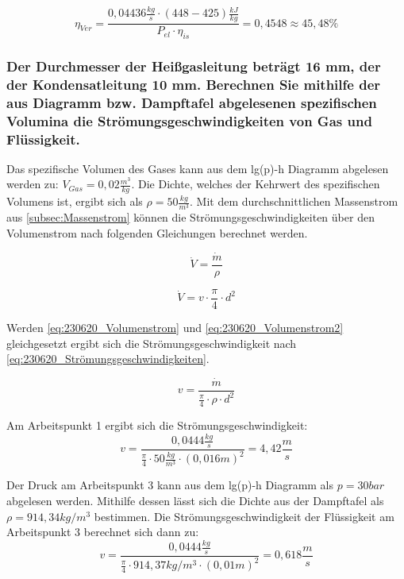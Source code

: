 $$\eta_{Ver} = \frac{0,04436 \frac{kg}{s}\cdot (448-425)\frac{kJ}{kg}}{P_{el}\cdot \eta_{is}}= 0,4548 \approx 45,48 \% $$

\subsubsection{Der Durchmesser der Heißgasleitung beträgt 16 mm, der der Kondensatleitung 10
mm. Berechnen Sie mithilfe der aus Diagramm bzw. Dampftafel abgelesenen spezifischen Volumina die Strömungsgeschwindigkeiten von Gas und Flüssigkeit.}

Das spezifische Volumen des Gases kann aus dem lg(p)-h Diagramm abgelesen werden zu: $V_{Gas}=0,02 \frac{m^3}{kg}$. Die Dichte, welches der Kehrwert des spezifischen Volumens ist, ergibt sich als $\rho=50 \frac{kg}{m^3}$. 
Mit dem durchschnittlichen Massenstrom aus \autoref{subsec:Massenstrom} können die Strömungsgeschwindigkeiten über den Volumenstrom nach folgenden Gleichungen berechnet werden.

\begin{equation}
    \dot{V}= \frac{\dot{m}}{\rho }
    \label{eq:230620_Volumenstrom}
\end{equation}

\begin{equation}
    \dot{V}= v \cdot \frac{\pi}{4} \cdot d^2
    \label{eq:230620_Volumenstrom2}
\end{equation}

Werden \autoref{eq:230620_Volumenstrom} und \autoref{eq:230620_Volumenstrom2} gleichgesetzt ergibt sich die Strömungsgeschwindigkeit nach \autoref{eq:230620_Strömungsgeschwindigkeiten}.

\begin{equation}
    v = \frac{\dot{m}}{\frac{\pi}{4}\cdot \rho \cdot d^2}
    \label{eq:230620_Strömungsgeschwindigkeiten}
\end{equation}

Am Arbeitspunkt 1 ergibt sich die Strömungsgeschwindigkeit:
$$v=\frac{0,0444 \frac{kg}{s}}{\frac{\pi}{4}\cdot 50 \frac{kg}{m^3} \cdot (0,016 m)^2}=4,42 \frac{m}{s} $$

Der Druck am Arbeitspunkt 3 kann aus dem lg(p)-h Diagramm als $p=30 bar$ abgelesen werden. Mithilfe dessen lässt sich die Dichte aus der Dampftafel als $\rho=914,34 kg/m^3$ bestimmen.
Die Strömungsgeschwindigkeit der Flüssigkeit am Arbeitspunkt 3 berechnet sich dann zu:
$$v=\frac{0,0444 \frac{kg}{s}}{\frac{\pi}{4}\cdot 914,37 kg/m^3 \cdot (0,01 m)^2}=0,618 \frac{m}{s} $$

